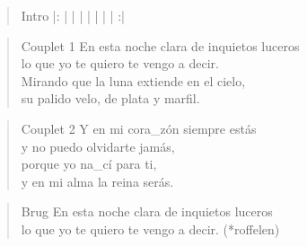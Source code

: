 \begin{verse}{Intro}
|:  |  \hspace{2em} | \hspace{3em} |  \hspace{2em} | \hspace{3em} |  \hspace{2em} | \hspace{3em} |  \hspace{2em} :|
\end{verse}
\begin{verse}{Couplet 1}
En esta noche clara de inquietos luceros\\
lo que yo te quiero te vengo a decir.\hspace{2em}\\
Mirando que la luna extiende en el cielo,\\
su palido velo, de plata y marfil.\\
\end{verse}

\begin{verse}{Couplet 2}
\hspace{2em}Y en mi cora\_z\'{o}n siempre est\'{a}s\\
y no puedo olvidarte jam\'{a}s,\\
\hspace{2em}porque yo na\_c\'{i} para ti,\\
\hspace{2em}y en mi alma la reina ser\'{a}s.\\
\end{verse}

\begin{verse}{Brug}
En esta noche clara de inquietos luceros\\
lo que yo te quiero te vengo a decir.\hspace{3em} (*roffelen)\\
\end{verse}

